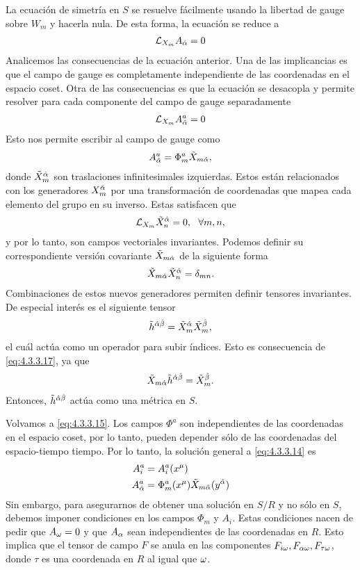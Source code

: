 La ecuación de simetría en $S$ se resuelve fácilmente usando la libertad de gauge sobre $W_m$ y hacerla nula. De esta forma, la ecuación se reduce a
\begin{align}
	\mathcal{L}_{X_m}A_{\hat{\alpha}} =0
\end{align}
Analicemos las consecuencias de la ecuación anterior. Una de las implicancias es que el campo de gauge es completamente independiente de las coordenadas en el espacio coset. Otra de las consecuencias es que la ecuación se desacopla y permite resolver para cada componente del campo de gauge separadamente
\begin{align}
	\mathcal{L}_{X_m}A^a_{\hat{\alpha}} =0 \label{eq:4.3.3.14}
\end{align}
Esto nos permite escribir al campo de gauge como
\begin{align}
	A^a_{\hat{\alpha}} = \Phi^a_m\tilde X_{m\hat{\alpha}}, \label{eq:4.3.3.15}
\end{align}
donde $\tilde X^{\hat{\alpha}}_m$ son traslaciones infinitesimales izquierdas. Estos están relacionados con los generadores $X^{\hat{\alpha}}_m$ por una transformación de coordenadas que mapea cada elemento del grupo en su inverso. Estas satisfacen que 
\begin{align}
	\mathcal{L}_{X_m}\tilde X^{\hat{\alpha}}_n=0, \ \ \forall m,n,
\end{align}
y por lo tanto, son campos vectoriales invariantes. Podemos definir su correspondiente versión covariante $\tilde X_{m\hat{\alpha}}$ de la siguiente forma
\begin{align}
	\tilde X_{m\hat{\alpha}}\tilde X^{\hat{\alpha}}_n=\delta_{mn}. \label{eq:4.3.3.17}
\end{align}
Combinaciones de estos nuevos generadores permiten definir tensores invariantes. De especial interés es el siguiente tensor
\begin{align}
	\tilde h^{\hat{\alpha}\hat{\beta}} = \tilde X^{\hat{\alpha}}_m\tilde X^{\hat{\beta}}_m,
\end{align}
el cuál actúa como un operador para subir índices. Esto es consecuencia de \eqref{eq:4.3.3.17}, ya que
\begin{align}
	\tilde X_{m\hat{\alpha}}\tilde h^{\hat{\alpha}\hat{\beta}} = \tilde X^{\hat{\beta}}_m.
\end{align}
Entonces, $\tilde h^{\hat{\alpha}\hat{\beta}}$ actúa como una métrica en $S$.

Volvamos a \eqref{eq:4.3.3.15}. Los campos $\Phi^a$ son independientes de las coordenadas en el espacio coset, por lo tanto, pueden depender sólo de las coordenadas del espacio-tiempo tiempo. Por lo tanto, la solución general a \eqref{eq:4.3.3.14} es
\begin{align}
	A_i^a &= A_i^a(x^\mu)\\
	A^a_{\hat{\alpha}} &= \Phi^a_m(x^\mu)\tilde X_{m\hat{\alpha}}(y^{\hat{\alpha}}) \label{eq:4.3.3.21}
\end{align}
Sin embargo, para asegurarnos de obtener una solución en $S/R$ y no sólo en $S$, debemos imponer condiciones en los campos $\Phi_m$ y $A_i$. Estas condiciones nacen de pedir que $A_\omega=0$ y que $A_\alpha$ sean independientes de las coordenadas en $R$. Esto implica que el tensor de campo $F$ se anula en las componentes $F_{i\omega},F_{\alpha\omega},F_{\tau\omega}$, donde $\tau$ es una coordenada en $R$ al igual que $\omega$.

